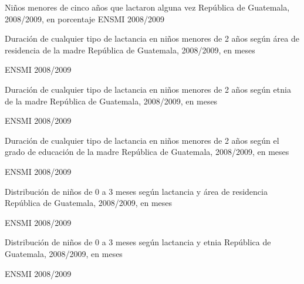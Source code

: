 
{%
 }%
{%
 Niños menores de cinco años que lactaron alguna vez} %
{%
 República de Guatemala, 2008/2009, en porcentaje} %
{%
}%
{%
 ENSMI 2008/2009} %



%
{%
}%
{%
	Duración de cualquier tipo de lactancia en niños menores de 2 años según área de residencia de la madre} %
{%
	República de Guatemala, 2008/2009, en meses} %
{%
	\begin{tikzpicture}[x=1pt,y=1pt]    \end{tikzpicture}
}%
{%
	ENSMI 2008/2009} %



%
{%
}%
{%
	Duración de cualquier tipo de lactancia en niños menores de 2 años según etnia de la madre} %
{%
	República de Guatemala, 2008/2009, en meses} %
{%
	\begin{tikzpicture}[x=1pt,y=1pt]    \end{tikzpicture}
}%
{%
	ENSMI 2008/2009} %


%
{%
}%
{%
	Duración de cualquier tipo de lactancia en niños menores de 2 años según el grado de educación de la madre} %
{%
	República de Guatemala, 2008/2009, en meses} %
{%
	\begin{tikzpicture}[x=1pt,y=1pt]    \end{tikzpicture}
}%
{%
	ENSMI 2008/2009} %



%
{%
}%
{%
	Distribución de niños de 0 a 3 meses según lactancia y área de residencia
	} %
{%
	República de Guatemala, 2008/2009, en meses} %
{%
	\begin{tikzpicture}[x=1pt,y=1pt]    \end{tikzpicture}
}%
{%
	ENSMI 2008/2009} %



%
{%
}%
{%
	Distribución de niños de 0 a 3 meses según lactancia y etnia
} %
{%
	República de Guatemala, 2008/2009, en meses} %
{%
	\begin{tikzpicture}[x=1pt,y=1pt]    \end{tikzpicture}
}%
{%
	ENSMI 2008/2009} %


